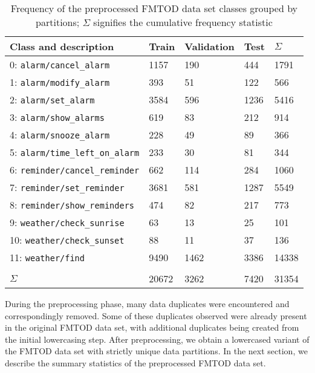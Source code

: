 \begin{table}[t!]
  \centering
  \begin{tabular}{lllll}
    \toprule
    Class and description & Train & Validation & Test & $\Sigma$ \\
    \midrule
    0: \texttt{alarm/cancel\_alarm} & 1157 & 190 & 444 & 1791 \\
    1: \texttt{alarm/modify\_alarm} & 393 & 51 & 122 & 566 \\
    2: \texttt{alarm/set\_alarm} & 3584 & 596 & 1236 & 5416 \\
    3: \texttt{alarm/show\_alarms} & 619 & 83 & 212 & 914 \\
    4: \texttt{alarm/snooze\_alarm} & 228 & 49 & 89 & 366 \\
    5: \texttt{alarm/time\_left\_on\_alarm} & 233 & 30 & 81 & 344 \\
    6: \texttt{reminder/cancel\_reminder} & 662 & 114 & 284 & 1060 \\
    7: \texttt{reminder/set\_reminder} & 3681 & 581 & 1287 & 5549 \\
    8: \texttt{reminder/show\_reminders} & 474 & 82 & 217 & 773 \\
    9: \texttt{weather/check\_sunrise} & 63 & 13 & 25 & 101 \\
    10: \texttt{weather/check\_sunset} & 88 & 11 & 37 & 136 \\
    11: \texttt{weather/find} & 9490 & 1462 & 3386 & 14338 \\[5pt]
    \hline \hline \\[-10pt]
    $\Sigma$ & 20672 & 3262 & 7420 & 31354 \\
    \bottomrule
  \end{tabular}
  \caption{Frequency of the preprocessed FMTOD data set classes grouped by
    partitions; $\Sigma$ signifies the cumulative frequency statistic}
  \label{tab:fmtod}
\end{table}

During the preprocessing phase, many data duplicates were encountered and
correspondingly removed. Some of these duplicates observed were already present
in the original FMTOD data set, with additional duplicates being created from
the initial lowercasing step. After preprocessing, we obtain a lowercased
variant of the FMTOD data set with strictly unique data partitions. In the next
section, we describe the summary statistics of the preprocessed FMTOD data set.

